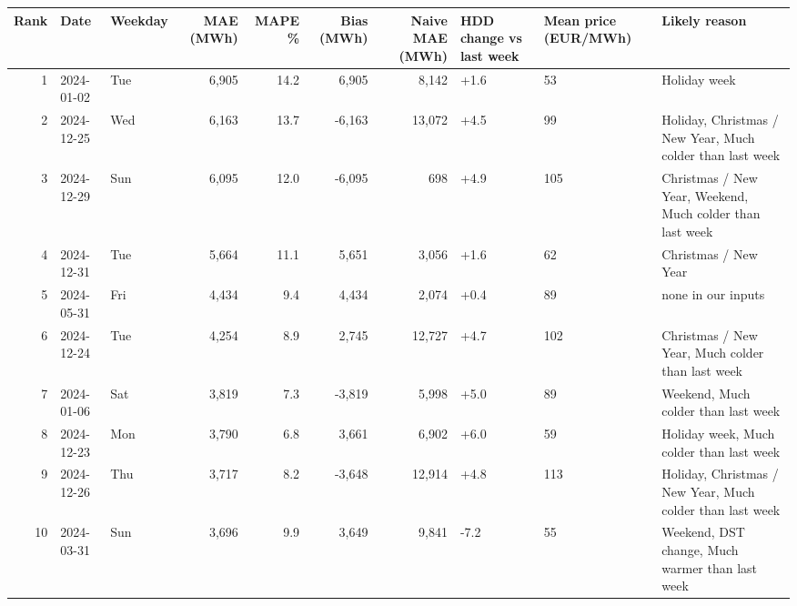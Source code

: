\begin{tabular}{rllrrrrlll}
\toprule
Rank & Date & Weekday & MAE (MWh) & MAPE \% & Bias (MWh) & Naive MAE (MWh) & HDD change vs last week & Mean price (EUR/MWh) & Likely reason \\
\midrule
1 & 2024-01-02 & Tue & 6,905 & 14.2 & 6,905 & 8,142 & +1.6 & 53 & Holiday week \\
2 & 2024-12-25 & Wed & 6,163 & 13.7 & -6,163 & 13,072 & +4.5 & 99 & Holiday, Christmas / New Year, Much colder than last week \\
3 & 2024-12-29 & Sun & 6,095 & 12.0 & -6,095 & 698 & +4.9 & 105 & Christmas / New Year, Weekend, Much colder than last week \\
4 & 2024-12-31 & Tue & 5,664 & 11.1 & 5,651 & 3,056 & +1.6 & 62 & Christmas / New Year \\
5 & 2024-05-31 & Fri & 4,434 & 9.4 & 4,434 & 2,074 & +0.4 & 89 & none in our inputs \\
6 & 2024-12-24 & Tue & 4,254 & 8.9 & 2,745 & 12,727 & +4.7 & 102 & Christmas / New Year, Much colder than last week \\
7 & 2024-01-06 & Sat & 3,819 & 7.3 & -3,819 & 5,998 & +5.0 & 89 & Weekend, Much colder than last week \\
8 & 2024-12-23 & Mon & 3,790 & 6.8 & 3,661 & 6,902 & +6.0 & 59 & Holiday week, Much colder than last week \\
9 & 2024-12-26 & Thu & 3,717 & 8.2 & -3,648 & 12,914 & +4.8 & 113 & Holiday, Christmas / New Year, Much colder than last week \\
10 & 2024-03-31 & Sun & 3,696 & 9.9 & 3,649 & 9,841 & -7.2 & 55 & Weekend, DST change, Much warmer than last week \\
\bottomrule
\end{tabular}
